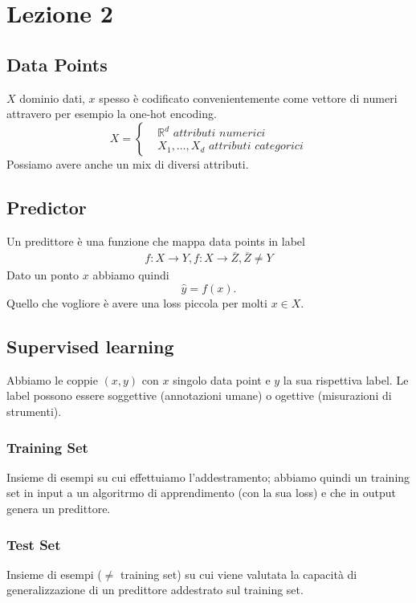 \documentclass{article}
\begin{document}
\section{Lezione 2}
\subsection{Data Points}
$X$ dominio dati, $x$ spesso è codificato convenientemente come vettore di numeri attravero per esempio la one-hot encoding.
\begin{displaymath}
	X=
	\begin{cases}
		&\mathbb{R}^d \textit{ attributi numerici} \\
		&X_1,\dots, X_d \textit{ attributi categorici}
	\end{cases}
\end{displaymath}
Possiamo avere anche un mix di diversi attributi.

\subsection{Predictor}
Un predittore è una funzione che mappa data points in label
\begin{displaymath}
	\begin{split}
		f: X \rightarrow Y, f: X \rightarrow \overline{Z}, \overline{Z} \neq Y 
	\end{split}
\end{displaymath}
Dato un ponto $x$ abbiamo quindi
\begin{displaymath}
	\hat{y}=f(x).
\end{displaymath}
Quello che vogliore è avere una loss piccola per molti $x \in X$.
\subsection{Supervised learning}
Abbiamo le coppie $(x,y)$ con $x$ singolo data point e $y$ la sua rispettiva label. Le label possono essere soggettive (annotazioni umane) o ogettive (misurazioni di strumenti).
\subsubsection{Training Set}
Insieme di esempi su cui effettuiamo l'addestramento; abbiamo quindi un training set in input a un algoritrmo di apprendimento (con la sua loss) e che in output genera un predittore.
\subsubsection{Test Set}
Insieme di esempi ($\neq$ training set) su cui viene valutata la capacità di generalizzazione di un predittore addestrato sul training set.
\end{document}
